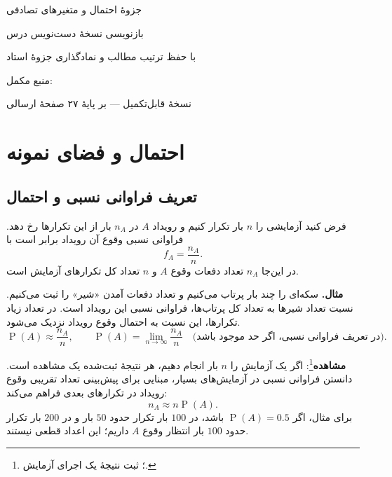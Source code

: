 \documentclass[12pt,a4paper,oneside]{book}
\newcommand{\Prob}{\operatorname{P}}
\begin{document}
\frontmatter
\begin{titlepage}
\centering
\vspace*{34mm}
{\Huge جزوهٔ احتمال و متغیرهای تصادفی\par}
\vspace{13mm}
{\Large بازنویسی نسخهٔ دست‌نویس درس\par}
\vspace{20mm}
{\large با حفظ ترتیب مطالب و نمادگذاری جزوهٔ استاد\par}
\vfill
{\large منبع مکمل: \par}
\vspace{8mm}
{نسخهٔ قابل‌تکمیل --- بر پایهٔ ۲۷ صفحهٔ ارسالی\par}
\end{titlepage}
\tableofcontents
\mainmatter

\chapter{احتمال و فضای نمونه}
\section{تعریف فراوانی نسبی و احتمال}
فرض کنید آزمایشی را $n$ بار تکرار کنیم و رویداد $A$ در $n_A$ بار از این تکرارها رخ دهد. فراوانی نسبی وقوع آن رویداد برابر است با
\begin{equation}\label{eq:relative-frequency}
f_A=\frac{n_A}{n}.
\end{equation}
در این‌جا $n_A$ تعداد دفعات وقوع $A$ و $n$ تعداد کل تکرارهای آزمایش است.

\textbf{مثال.} سکه‌ای را چند بار پرتاب می‌کنیم و تعداد دفعات آمدن «شیر» را ثبت می‌کنیم. نسبت تعداد شیرها به تعداد کل پرتاب‌ها، فراوانی نسبی این رویداد است. در تعداد زیاد تکرارها، این نسبت به احتمال وقوع رویداد نزدیک می‌شود.
\begin{equation}
\Prob(A)\approx\frac{n_A}{n},\qquad
\Prob(A)=\lim_{n\to\infty}\frac{n_A}{n}\quad\text{(در تعریف فراوانی نسبی، اگر حد موجود باشد).}
\end{equation}

\textbf{مشاهده}\footnote{؛ ثبت نتیجهٔ یک اجرای آزمایش.}:
اگر یک آزمایش را $n$ بار انجام دهیم، هر نتیجهٔ ثبت‌شده یک مشاهده است. دانستن فراوانی نسبی در آزمایش‌های بسیار، مبنایی برای پیش‌بینی تعداد تقریبی وقوع رویداد در تکرارهای بعدی فراهم می‌کند:
\begin{equation}n_A\approx n\Prob(A).\end{equation}
برای مثال، اگر $\Prob(A)=0.5$ باشد، در $100$ بار تکرار حدود $50$ بار و در $200$ بار تکرار حدود $100$ بار انتظار وقوع $A$ داریم؛ این اعداد قطعی نیستند.
\end{document}
